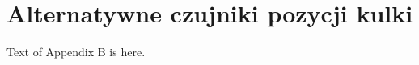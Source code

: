 \chapter{Alternatywne czujniki pozycji kulki}
\label{appB_alternatywne_czujniki_pozycji_kulki}

Text of Appendix B is here.
